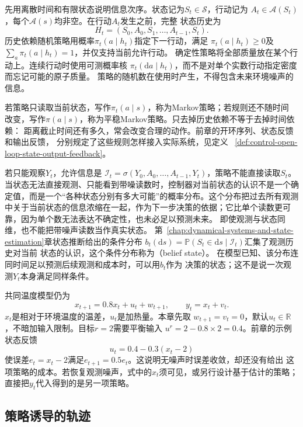 先用离散时间和有限状态说明信息次序。状态记为$S_t\in\mathcal S$，行动记为
$A_t\in\mathcal A(S_t)$，每个$\mathcal A(s)$均非空。在行动$A_t$发生之前，完整
状态历史为
\[
  H_t=(S_0,A_0,S_1,\ldots,A_{t-1},S_t).
\]
历史依赖随机策略用概率$\pi_t(a\mid h_t)$指定下一行动，满足
$\pi_t(a\mid h_t)\geq0$及$\sum_a\pi_t(a\mid h_t)=1$，并仅支持当前允许行动。
确定性策略将全部质量放在某个行动上。连续行动时使用可测概率核
$\pi_t(\mathrm da\mid h_t)$，而不是对单个实数行动指定密度而忘记可能的原子质量。
策略的随机数在使用时产生，不得包含未来环境噪声的信息。

若策略只读取当前状态，写作$\pi_t(a\mid s)$，称为Markov策略；若规则还不随时间
改变，写作$\pi(a\mid s)$，称为平稳Markov策略。只去掉历史依赖不等于去掉时间依赖：
距离截止时间还有多久，常会改变合理的动作。前章的开环序列、状态反馈和输出反馈，
分别规定了这些规则怎样接入实际系统，见定义
~\ref{def:control-open-loop-state-output-feedback}。

若只能观察$Y_t$，允许信息是
$\mathcal I_t=\sigma(Y_0,A_0,\ldots,A_{t-1},Y_t)$，策略不能直接读取$S_t$。
当状态无法直接观测、只能看到带噪读数时，控制器对当前状态的认识不是一个确定值，而是一个“各种状态分别有多大可能”的概率分布。这个分布把过去所有观测中关于当前状态的信息浓缩在一起，作为下一步决策的依据；它比单个读数更可靠，因为单个数无法表达不确定性，也未必足以预测未来。
即使观测与状态同维，也不能把带噪声读数当作真实状态。
第~\ref{chap:dynamical-systems-and-state-estimation}章状态推断给出的条件分布
$b_t(\mathrm ds)=\mathbb P(S_t\in\mathrm ds\mid\mathcal I_t)$汇集了观测历史对当前
状态的认识，这个条件分布称为（belief state）。
在模型已知、该分布连同时间足以预测后续观测和成本时，可以用$b_t$作为
决策的状态；这不是说一次观测$Y_t$本身满足同样条件。

共同温度模型仍为
\begin{equation}
  x_{t+1}=0.8x_t+u_t+w_{t+1},
  \qquad y_t=x_t+v_t.
  \label{eq:policy-temperature-model}
\end{equation}
$x_t$是相对于环境温度的温差，$u_t$是加热量。本章先取
$w_{t+1}=v_t=0$，默认$u_t\in\mathbb R$，不暗加输入限制。目标$r=2$需要平衡输入
$u^r=2-0.8\times2=0.4$。前章的示例状态反馈
\begin{equation}
  u_t=0.4-0.3(x_t-2)
  \label{eq:policy-temperature-feedback}
\end{equation}
使误差$e_t=x_t-2$满足$e_{t+1}=0.5e_t$。这说明无噪声时误差收敛，却还没有给出
这项策略的成本。若恢复观测噪声，式中的$x_t$须可见，或另行设计基于估计的策略；
直接把$y_t$代入得到的是另一项策略。

\subsection{策略诱导的轨迹}
\label{sec:policy-induced-trajectories}

